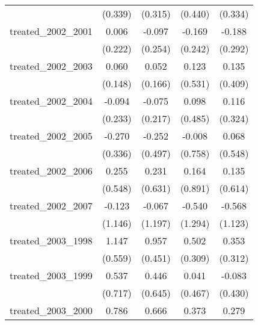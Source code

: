 {\begin{tabular}{l*{4}{c}}
            &     (0.339)         &     (0.315)         &     (0.440)         &     (0.334)         \\
[1em]
treated\_2002\_2001&       0.006         &      -0.097         &      -0.169         &      -0.188         \\
            &     (0.222)         &     (0.254)         &     (0.242)         &     (0.292)         \\
[1em]
treated\_2002\_2003&       0.060         &       0.052         &       0.123         &       0.135         \\
            &     (0.148)         &     (0.166)         &     (0.531)         &     (0.409)         \\
[1em]
treated\_2002\_2004&      -0.094         &      -0.075         &       0.098         &       0.116         \\
            &     (0.233)         &     (0.217)         &     (0.485)         &     (0.324)         \\
[1em]
treated\_2002\_2005&      -0.270         &      -0.252         &      -0.008         &       0.068         \\
            &     (0.336)         &     (0.497)         &     (0.758)         &     (0.548)         \\
[1em]
treated\_2002\_2006&       0.255         &       0.231         &       0.164         &       0.135         \\
            &     (0.548)         &     (0.631)         &     (0.891)         &     (0.614)         \\
[1em]
treated\_2002\_2007&      -0.123         &      -0.067         &      -0.540         &      -0.568         \\
            &     (1.146)         &     (1.197)         &     (1.294)         &     (1.123)         \\
[1em]
treated\_2003\_1998&       1.147\sym{*}  &       0.957\sym{*}  &       0.502         &       0.353         \\
            &     (0.559)         &     (0.451)         &     (0.309)         &     (0.312)         \\
[1em]
treated\_2003\_1999&       0.537         &       0.446         &       0.041         &      -0.083         \\
            &     (0.717)         &     (0.645)         &     (0.467)         &     (0.430)         \\
[1em]
treated\_2003\_2000&       0.786         &       0.666         &       0.373\sym{**} &       0.279\sym{*}  \\

\end{tabular}}
